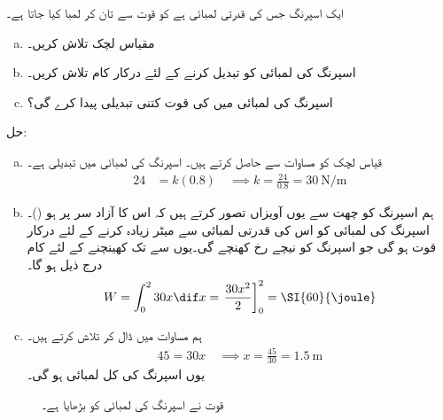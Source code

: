 ایک اسپرنگ جس کی قدرتی لمبائی  ہے کو  قوت سے تان کر  لمبا کیا جاتا ہے۔
\begin{enumerate}[a.]
\item
مقیاس لچک  تلاش کریں۔
\item
اسپرنگ کی لمبائی کو  تبدیل کرنے کے لئے درکار کام تلاش کریں۔
\item
اسپرنگ کی لمبائی میں  کی قوت کتنی تبدیلی پیدا کرے گی؟ 
\end{enumerate}
حل:
\begin{enumerate}[a.]
\item
{}\quad
قیاس لچک کو مساوات  سے حاصل کرتے ہیں۔ اسپرنگ کی لمبائی میں تبدیلی  ہے۔
\begin{align*}
24&=k(0.8)\quad \implies k=\frac{24}{0.8}=\SI{30}{\newton\per\meter}
\end{align*}
\item
{}\quad
ہم اسپرنگ کو چھت سے یوں آویزاں تصور کرتے ہیں کہ اس کا آزاد سر  پر ہو ()۔اسپرنگ کی لمبائی کو اس کی  قدرتی لمبائی سے  میٹر زیادہ کرنے کے لئے درکار قوت  ہو گی جو اسپرنگ کو نیچے رخ کھنچے گی۔یوں  سے  تک کھینچنے کے لئے کام درج ذیل ہو گا۔
\begin{align*}
W=\int_0^2 30x\dif x=\left.\frac{30x^2}{2}\right]_0^2=\SI{60}{\joule}
\end{align*}
\item
{}\quad
ہم مساوات  میں  ڈال کر  تلاش کرتے ہیں۔
\begin{align*}
45=30x\quad\implies x=\frac{45}{30}=\SI{1.5}{\meter} 
\end{align*}
یوں اسپرنگ کی کل لمبائی  ہو گی۔
\end{enumerate}
\begin{figure}
\centering
{}
\caption{قوت نے اسپرنگ کی لمبائی کو بڑھایا ہے۔}
\label{شکل_مثال_تکمل_استعمال_تان_اسپرنگ_ب}
\end{figure}

